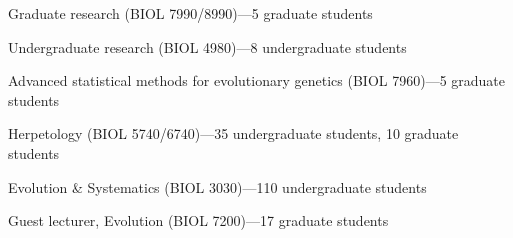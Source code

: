 \begin{veryTightItemize}
    \item Graduate research (BIOL 7990/8990)---5 graduate students
    \item Undergraduate research (BIOL 4980)---8 undergraduate students
    \item Advanced statistical methods for evolutionary genetics (BIOL 7960)---5 graduate students
    \item Herpetology (BIOL 5740/6740)---35 undergraduate students, 10 graduate students
    \item Evolution \& Systematics (BIOL 3030)---110 undergraduate students
    \item Guest lecturer, Evolution (BIOL 7200)---17 graduate students
\end{veryTightItemize}
